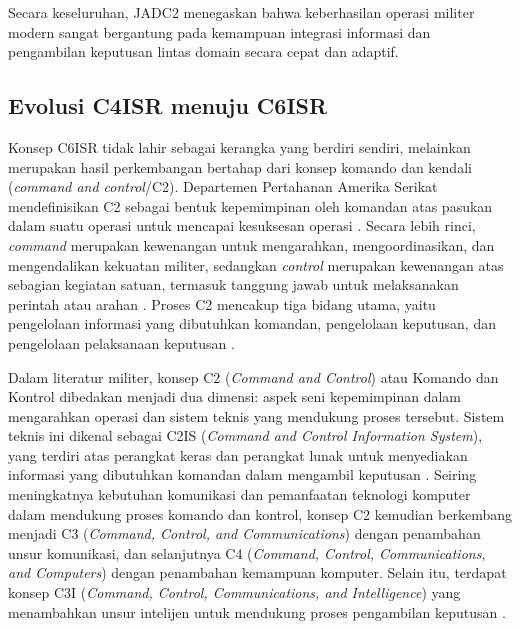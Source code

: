 Secara keseluruhan, JADC2 menegaskan bahwa keberhasilan operasi militer modern sangat bergantung pada kemampuan integrasi informasi dan pengambilan keputusan lintas domain secara cepat dan adaptif.

\subsection{Evolusi C4ISR menuju C6ISR}
\label{subsec:evolusi-c6isr}
Konsep C6ISR tidak lahir sebagai kerangka yang berdiri sendiri, melainkan merupakan hasil perkembangan bertahap dari konsep komando dan kendali (\textit{command and control}/C2).
Departemen Pertahanan Amerika Serikat mendefinisikan C2 sebagai bentuk kepemimpinan oleh komandan atas pasukan dalam suatu operasi untuk mencapai kesuksesan operasi \parencite{Petrovski2023}.
Secara lebih rinci, \textit{command} merupakan kewenangan untuk mengarahkan, mengoordinasikan, dan mengendalikan kekuatan militer, sedangkan \textit{control} merupakan kewenangan atas sebagian kegiatan satuan, termasuk tanggung jawab untuk melaksanakan perintah atau arahan \parencite{Todorovic2025}.
Proses C2 mencakup tiga bidang utama, yaitu pengelolaan informasi yang dibutuhkan komandan, pengelolaan keputusan, dan pengelolaan pelaksanaan keputusan \parencite{Petrovski2023}.

Dalam literatur militer, konsep C2 (\textit{Command and Control}) atau Komando dan Kontrol dibedakan menjadi dua dimensi: aspek seni kepemimpinan dalam mengarahkan operasi dan sistem teknis yang mendukung proses tersebut.
Sistem teknis ini dikenal sebagai C2IS (\textit{Command and Control Information System}), yang terdiri atas perangkat keras dan perangkat lunak untuk menyediakan informasi yang dibutuhkan komandan dalam mengambil keputusan \parencite{Todorovic2025}.
Seiring meningkatnya kebutuhan komunikasi dan pemanfaatan teknologi komputer dalam mendukung proses komando dan kontrol, konsep C2 kemudian berkembang menjadi C3 (\textit{Command, Control, and Communications}) dengan penambahan unsur komunikasi, dan selanjutnya C4 (\textit{Command, Control, Communications, and Computers}) dengan penambahan kemampuan komputer.
Selain itu, terdapat konsep C3I (\textit{Command, Control, Communications, and Intelligence}) yang menambahkan unsur intelijen untuk mendukung proses pengambilan keputusan \parencite{Todorovic2025}.

